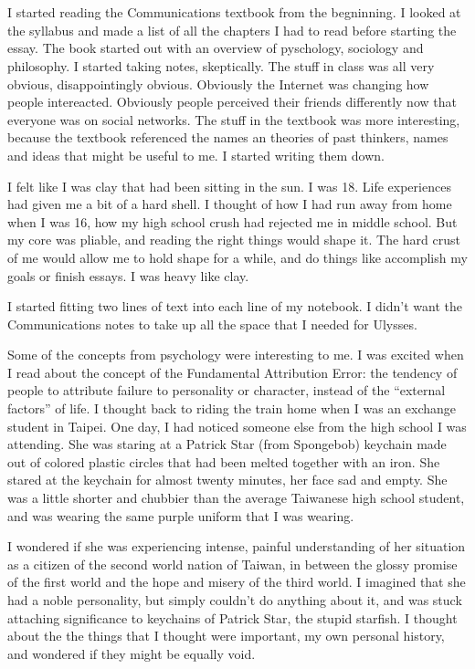\section{}

I started reading the Communications textbook from the begninning.  I looked at
the syllabus and made a list of all the chapters I had to read before starting
the essay.  The book started out with an overview of pyschology, sociology and
philosophy.  I started taking notes, skeptically.  The stuff in class was all
very obvious, disappointingly obvious.  Obviously the Internet was changing how
people intereacted.  Obviously people perceived their friends differently now
that everyone was on social networks.  The stuff in the textbook was more
interesting, because the textbook referenced the names an theories of past
thinkers, names and ideas that might be useful to me.  I started writing them
down. 

I felt like I was clay that had been sitting in the sun.  I was 18.  Life
experiences had given me a bit of a hard shell.  I thought of how I had run away
from home when I was 16, how my high school crush had rejected me in middle
school.  But my core was pliable, and reading the right things would shape it.
The hard crust of me would allow me to hold shape for a while, and do things
like accomplish my goals or finish essays.  I was heavy like clay.

I started fitting two lines of text into each line of my notebook.  I didn't
want the Communications notes to take up all the space that I needed for
Ulysses.  

Some of the concepts from psychology were interesting to me.  I was excited when
I read about the concept of the Fundamental Attribution Error: the tendency of
people to attribute failure to personality or character, instead of the
``external factors'' of life.  I thought back to riding the train home when I
was an exchange student in Taipei.  One day, I had noticed someone else from the
high school I was attending.  She was staring at a Patrick Star (from Spongebob)
keychain made out of colored plastic circles that had been melted together with
an iron.  She stared at the keychain for almost twenty minutes, her face sad and
empty.  She was a little shorter and chubbier than the average Taiwanese high
school student, and was wearing the same purple uniform that I was wearing.

I wondered if she was experiencing intense, painful understanding of her
situation as a citizen of the second world nation of Taiwan, in between the
glossy promise of the first world and the hope and misery of the third world.  I
imagined that she had a noble personality, but simply couldn't do anything about
it, and was stuck attaching significance to keychains of Patrick Star, the
stupid starfish.  I thought about the the things that I thought were important,
my own personal history, and wondered if they might be equally void.

